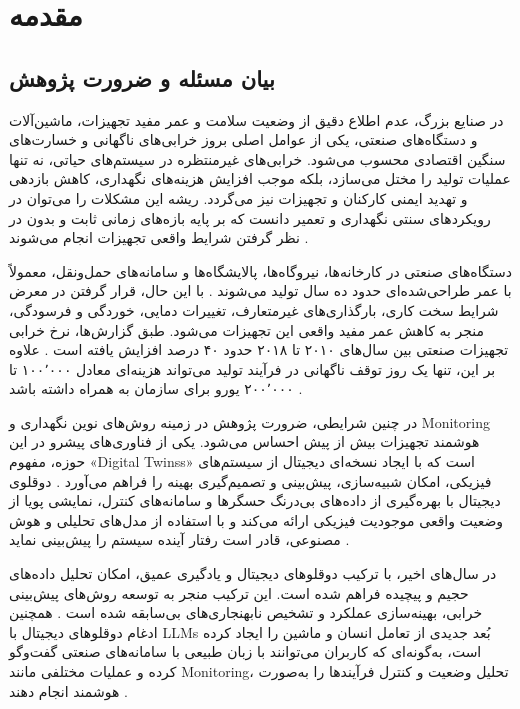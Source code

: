 \documentclass[a4paper,fleqn]{report}
\begin{document}
\pagestyle{myheadings}


\chapter{مقدمه}  
  
  
  \section{بیان مسئله و ضرورت پژوهش}
  
  در صنایع بزرگ، عدم اطلاع دقیق از وضعیت سلامت و عمر مفید تجهیزات، ماشین‌آلات و دستگاه‌های صنعتی، یکی از عوامل اصلی بروز خرابی‌های ناگهانی و خسارت‌های سنگین اقتصادی محسوب می‌شود. خرابی‌های غیرمنتظره در سیستم‌های حیاتی، نه تنها عملیات تولید را مختل می‌سازد، بلکه موجب افزایش هزینه‌های نگهداری، کاهش بازدهی و تهدید ایمنی کارکنان و تجهیزات نیز می‌گردد. ریشه این مشکلات را می‌توان در رویکردهای سنتی نگهداری و تعمیر دانست که بر پایه بازه‌های زمانی ثابت و بدون در نظر گرفتن شرایط واقعی تجهیزات انجام می‌شوند \cite{ismail2025systematic}.
  
دستگاه‌های صنعتی در کارخانه‌ها، نیروگاه‌ها، پالایشگاه‌ها و سامانه‌های حمل‌ونقل، معمولاً با عمر طراحی‌شده‌ای حدود ده سال تولید می‌شوند \cite{aivaliotis2021degradation}. با این حال، قرار گرفتن در معرض شرایط سخت کاری، بارگذاری‌های غیرمتعارف، تغییرات دمایی، خوردگی و فرسودگی، منجر به کاهش عمر مفید واقعی این تجهیزات می‌شود. طبق گزارش‌ها، نرخ خرابی تجهیزات صنعتی بین سال‌های ۲۰۱۰ تا ۲۰۱۸ حدود ۴۰ درصد افزایش یافته است \cite{corchado2019failure}. علاوه بر این، تنها یک روز توقف ناگهانی در فرآیند تولید می‌تواند هزینه‌ای معادل ۱۰۰٬۰۰۰ تا ۲۰۰٬۰۰۰ یورو برای سازمان به همراه داشته باشد \cite{mathur2001reasoning}.
  
در چنین شرایطی، ضرورت پژوهش در زمینه روش‌های نوین نگهداری و \gls{Monitoring} هوشمند تجهیزات بیش از پیش احساس می‌شود. یکی از فناوری‌های پیشرو در این حوزه، مفهوم «\glspl{Digital Twins}» است که با ایجاد نسخه‌ای دیجیتال از سیستم‌های فیزیکی، امکان شبیه‌سازی، پیش‌بینی و تصمیم‌گیری بهینه را فراهم می‌آورد \cite{tao2019digital}. دوقلوی دیجیتال با بهره‌گیری از داده‌های بی‌درنگ حسگرها و سامانه‌های کنترل، نمایشی پویا از وضعیت واقعی موجودیت فیزیکی ارائه می‌کند و با استفاده از مدل‌های تحلیلی و هوش مصنوعی، قادر است رفتار آینده سیستم را پیش‌بینی نماید \cite{vandinter2022predictive}.  
  
در سال‌های اخیر، با ترکیب دوقلوهای دیجیتال و یادگیری عمیق، امکان تحلیل داده‌های حجیم و پیچیده فراهم شده است. این ترکیب منجر به توسعه روش‌های پیش‌بینی خرابی، بهینه‌سازی عملکرد و تشخیص نابهنجاری‌های بی‌سابقه شده است \cite{lv2024artificial, kreuzer2024artificial}. همچنین ادغام دوقلوهای دیجیتال با \glspl{LLM} بُعد جدیدی از تعامل انسان و ماشین را ایجاد کرده است، به‌گونه‌ای که کاربران می‌توانند با زبان طبیعی با سامانه‌های صنعتی گفت‌وگو کرده و عملیات مختلفی مانند \gls{Monitoring}، تحلیل وضعیت و کنترل فرآیندها را به‌صورت هوشمند انجام دهند \cite{CHEN2025102982LLMDT}.
  
\end{document}
